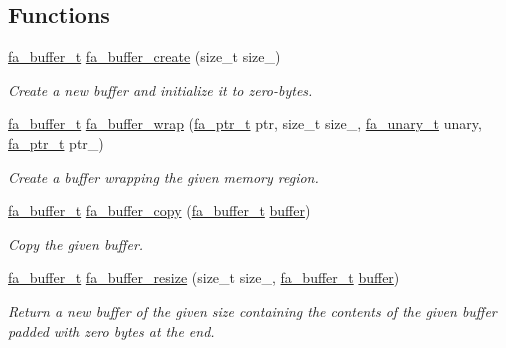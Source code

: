 \subsection*{Functions}
\begin{DoxyCompactItemize}
\item 
\hyperlink{group___fa_buffer_ga0ed7a1d783ab322e2e8be02432d0839e}{fa\-\_\-buffer\-\_\-t} \hyperlink{group___fa_buffer_ga67c4124d193bca81a6e21ec04d9ff832}{fa\-\_\-buffer\-\_\-create} (size\-\_\-t size\-\_\-)
\begin{DoxyCompactList}\small\item\em Create a new buffer and initialize it to zero-\/bytes. \end{DoxyCompactList}\item 
\hyperlink{group___fa_buffer_ga0ed7a1d783ab322e2e8be02432d0839e}{fa\-\_\-buffer\-\_\-t} \hyperlink{group___fa_buffer_gabc24b8a0d76fcd92c1f9071c34a55704}{fa\-\_\-buffer\-\_\-wrap} (\hyperlink{group___fa_ga915ddeae99ad7568b273d2b876425197}{fa\-\_\-ptr\-\_\-t} ptr, size\-\_\-t size\-\_\-, \hyperlink{group___fa_gaaafae8ab9ebae9019133108e56d2d4d1}{fa\-\_\-unary\-\_\-t} unary, \hyperlink{group___fa_ga915ddeae99ad7568b273d2b876425197}{fa\-\_\-ptr\-\_\-t} ptr\-\_\-)
\begin{DoxyCompactList}\small\item\em Create a buffer wrapping the given memory region. \end{DoxyCompactList}\item 
\hyperlink{group___fa_buffer_ga0ed7a1d783ab322e2e8be02432d0839e}{fa\-\_\-buffer\-\_\-t} \hyperlink{group___fa_buffer_ga11c1b1ce03700c52a38ff4f87cc0eeec}{fa\-\_\-buffer\-\_\-copy} (\hyperlink{group___fa_buffer_ga0ed7a1d783ab322e2e8be02432d0839e}{fa\-\_\-buffer\-\_\-t} \hyperlink{util_8h_ad0c623e8b04565926f5b48888327724a}{buffer})
\begin{DoxyCompactList}\small\item\em Copy the given buffer. \end{DoxyCompactList}\item 
\hyperlink{group___fa_buffer_ga0ed7a1d783ab322e2e8be02432d0839e}{fa\-\_\-buffer\-\_\-t} \hyperlink{group___fa_buffer_ga2e0379c378fad447bc00890b4c55d0f9}{fa\-\_\-buffer\-\_\-resize} (size\-\_\-t size\-\_\-, \hyperlink{group___fa_buffer_ga0ed7a1d783ab322e2e8be02432d0839e}{fa\-\_\-buffer\-\_\-t} \hyperlink{util_8h_ad0c623e8b04565926f5b48888327724a}{buffer})
\begin{DoxyCompactList}\small\item\em Return a new buffer of the given size containing the contents of the given buffer padded with zero bytes at the end. \end{DoxyCompactList}\item 

\end{DoxyCompactItemize}
